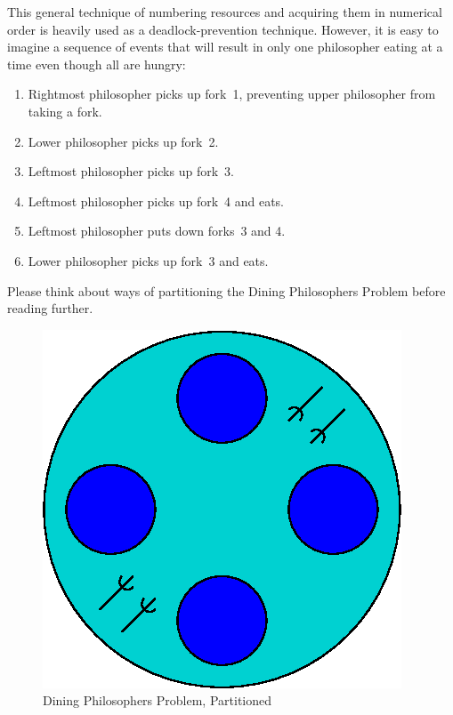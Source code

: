This general technique of numbering resources and acquiring them in
numerical order is heavily used as a deadlock-prevention technique.
However, it is easy to imagine a sequence of events that will result
in only one philosopher eating at a time even though all are hungry:

\begin{enumerate}
\item	Rightmost philosopher picks up fork~1, preventing upper philosopher
	from taking a fork.
\item	Lower philosopher picks up fork~2.
\item	Leftmost philosopher picks up fork~3.
\item	Leftmost philosopher picks up fork~4 and eats.
\item	Leftmost philosopher puts down forks~3 and 4.
\item	Lower philosopher picks up fork~3 and eats.
\end{enumerate}

Please think about ways of partitioning the Dining Philosophers Problem
before reading further.
\clearpage


\begin{figure}[tb]
\begin{center}
\includegraphics{SMPdesign/DiningPhilosopher4part}
\end{center}
\caption{Dining Philosophers Problem, Partitioned}
\label{fig:SMPdesign:Dining Philosophers Problem, Partitioned}
\end{figure}


